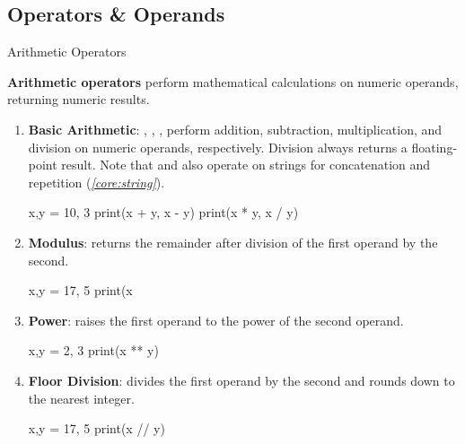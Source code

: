 \documentclass[10pt]{article}
\begin{document}
  \subsection{Operators \& Operands}

    \begin{core}[label=core:arithmetic_operators]{Arithmetic Operators}

      \textbf{Arithmetic operators} perform mathematical calculations on numeric operands, returning numeric results.

      \begin{enumerate}

        \item \textbf{Basic Arithmetic}: \textcode{+}, \textcode{-}, \textcode{*}, \textcode{/} perform addition, subtraction, multiplication, and division on numeric operands, respectively. Division always returns a floating-point result. Note that \textcode{+} and \textcode{*} also operate on strings for concatenation and repetition (\textit{\autoref{core:string}}).

        \begin{pyconsole}

          x,y = 10, 3
          print(x + y, x - y)
          print(x * y, x / y)

        \end{pyconsole}
        
        \item \textbf{Modulus}: \textcode{\%} returns the remainder after division of the first operand by the second.

        \begin{pyconsole}

          x,y = 17, 5
          print(x %
        \end{pyconsole}
        
        \item \textbf{Power}: \textcode{**} raises the first operand to the power of the second operand.

        \begin{pyconsole}

          x,y = 2, 3
          print(x ** y)

        \end{pyconsole}
        
        \item \textbf{Floor Division}: \textcode{//} divides the first operand by the second and rounds down to the nearest integer.

        \begin{pyconsole}

          x,y = 17, 5
          print(x // y)

        \end{pyconsole}

      \end{enumerate}

    \end{core}
\end{document}
